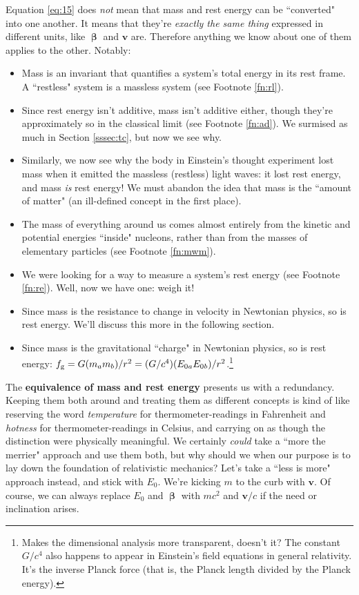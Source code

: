 \documentclass[12pt]{article}
\renewcommand{\vv}[1]{\mathbf{#1}}
\newcommand{\vvbeta}{\bm{\upbeta}}
\begin{document}
Equation \ref{eq:15} does \emph{not} mean that mass and rest energy can be ``converted" into one another. It means that they're \emph{exactly the same thing} expressed in different units, like $\vvbeta$ and $\vv v$ are. Therefore anything we know about one of them applies to the other. Notably:
\begin{itemize}
\item Mass is an invariant that quantifies a system's total energy in its rest frame. A ``restless" system is a massless system (see Footnote \ref{fn:rl}).
\item Since rest energy isn't additive, mass isn't additive either, though they're approximately so in the classical limit (see Footnote \ref{fn:ad}). We surmised as much in Section \ref{sssec:tc}, but now we see why.
\item Similarly, we now see why the body in Einstein's thought experiment lost mass when it emitted the massless (restless) light waves: it lost rest energy, and mass \emph{is} rest energy! We must abandon the idea that mass is the ``amount of matter" (an ill-defined concept in the first place).
\item The mass of everything around us comes almost entirely from the kinetic and potential energies ``inside" nucleons, rather than from the masses of elementary particles (see Footnote \ref{fn:mwm}).
\item We were looking for a way to measure a system's rest energy (see Footnote \ref{fn:re}). Well, now we have one: weigh it!
\item Since mass is the resistance to change in velocity in Newtonian physics, so is rest energy. We'll discuss this more in the following section.
\item Since mass is the gravitational ``charge" in Newtonian physics, so is rest energy: $f_{\mathrm{g}} = G(m_a m_b)/r^2 = (G/c^4)(E_{0 \mkern.5mu a} E_{0 \mkern.5mu b})/r^2$.\footnote{Makes the dimensional analysis more transparent, doesn't it? The constant $G / c^4$ also happens to appear in Einstein's field equations in general relativity. It's the inverse Planck force (that is, the Planck length divided by the Planck energy).}
\end{itemize}

The \textbf{equivalence of mass and rest energy} presents us with a redundancy. Keeping them both around and treating them as different concepts is kind of like reserving the word \emph{temperature} for thermometer-readings in Fahrenheit and \emph{hotness} for thermometer-readings in Celsius, and carrying on as though the distinction were physically meaningful. We certainly \emph{could} take a ``more the merrier" approach and use them both, but why should we when our purpose is to lay down the foundation of relativistic mechanics? Let's take a ``less is more" approach instead, and stick with $E_0$. We're kicking $m$ to the curb with $\vv v$. Of course, we can always replace $E_0$ and $\vvbeta$ with $mc^2$ and $\vv v/c$ if the need or inclination arises.
\end{document}
